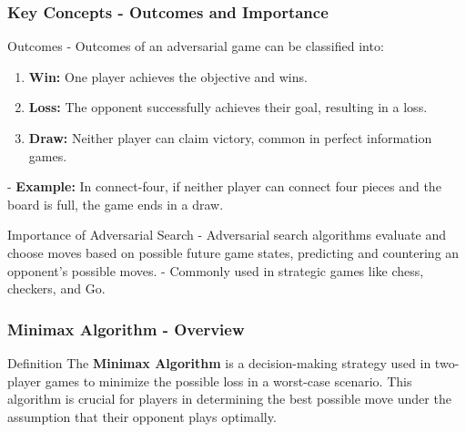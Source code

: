 \documentclass[aspectratio=169]{beamer}
\begin{document}
\begin{frame}[fragile]
    \frametitle{Key Concepts - Outcomes and Importance}
    \begin{block}{Outcomes}
        - Outcomes of an adversarial game can be classified into:
            \begin{enumerate}
                \item \textbf{Win:} One player achieves the objective and wins.
                \item \textbf{Loss:} The opponent successfully achieves their goal, resulting in a loss.
                \item \textbf{Draw:} Neither player can claim victory, common in perfect information games.
            \end{enumerate}
        - \textbf{Example:} In connect-four, if neither player can connect four pieces and the board is full, the game ends in a draw.
    \end{block}

    \begin{block}{Importance of Adversarial Search}
        - Adversarial search algorithms evaluate and choose moves based on possible future game states, predicting and countering an opponent's possible moves.
        - Commonly used in strategic games like chess, checkers, and Go.
    \end{block}
\end{frame}

\begin{frame}[fragile]
    \frametitle{Minimax Algorithm - Overview}
    \begin{block}{Definition}
        The \textbf{Minimax Algorithm} is a decision-making strategy used in two-player games to minimize the possible loss in a worst-case scenario. This algorithm is crucial for players in determining the best possible move under the assumption that their opponent plays optimally.
    \end{block}
\end{frame}
\end{document}
